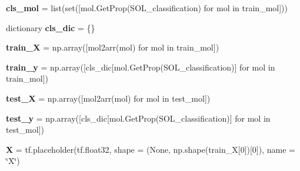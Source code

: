 \begin{DoxyCompactItemize}
\item 
\mbox{\label{namespacechemistry2quant_1_1chem2quant__NN_a96885acb316afc3fb8721ee0b7a76c3d}} 
{\bfseries cls\+\_\+mol} = list(set(\mbox{[}mol.\+Get\+Prop(\textquotesingle{}S\+O\+L\+\_\+classification\textquotesingle{}) for mol in train\+\_\+mol\mbox{]}))
\item 
\mbox{\label{namespacechemistry2quant_1_1chem2quant__NN_a359d880d0923047ca854cb9050359b32}} 
dictionary {\bfseries cls\+\_\+dic} = \{\}
\item 
\mbox{\label{namespacechemistry2quant_1_1chem2quant__NN_a06329b74e3f211dff365a79893b6cd4f}} 
{\bfseries train\+\_\+X} = np.\+array(\mbox{[}mol2arr(mol) for mol in train\+\_\+mol\mbox{]})
\item 
\mbox{\label{namespacechemistry2quant_1_1chem2quant__NN_a7da1862279e9df8e0305363c85e02bf8}} 
{\bfseries train\+\_\+y} = np.\+array(\mbox{[}cls\+\_\+dic\mbox{[}mol.\+Get\+Prop(\textquotesingle{}S\+O\+L\+\_\+classification\textquotesingle{})\mbox{]} for mol in train\+\_\+mol\mbox{]})
\item 
\mbox{\label{namespacechemistry2quant_1_1chem2quant__NN_aa5df3088953e1165b7b409826f8ff8f2}} 
{\bfseries test\+\_\+X} = np.\+array(\mbox{[}mol2arr(mol) for mol in test\+\_\+mol\mbox{]})
\item 
\mbox{\label{namespacechemistry2quant_1_1chem2quant__NN_a0e602d2f7f57448626ab0030b1095fa7}} 
{\bfseries test\+\_\+y} = np.\+array(\mbox{[}cls\+\_\+dic\mbox{[}mol.\+Get\+Prop(\textquotesingle{}S\+O\+L\+\_\+classification\textquotesingle{})\mbox{]} for mol in test\+\_\+mol\mbox{]})
\item 
\mbox{\label{namespacechemistry2quant_1_1chem2quant__NN_a058e0566d51ad7901338a7446d4f687e}} 
{\bfseries X} = tf.\+placeholder(tf.\+float32, shape = (None, np.\+shape(train\+\_\+X\mbox{[}0\mbox{]})\mbox{[}0\mbox{]}), name = \char`\"{}X\char`\"{})
\item 
\mbox{\label{namespacechemistry2quant_1_1chem2quant__NN_ad06d919809e5ad7f397a7106cdf2cd9d}} 

\end{DoxyCompactItemize}
